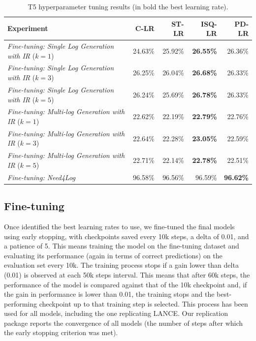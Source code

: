 \begin{table}[h!]
	\centering
	\caption{T5 hyperparameter tuning results (in bold the best learning rate).}
	\begin{tabular}{lrrrr}
		\toprule
		\textbf{Experiment}                  																		& \textbf{C-LR}              & \textbf{ST-LR}      & \textbf{ISQ-LR}        & \textbf{PD-LR} \\
		\midrule
		\textit{Fine-tuning: Single Log Generation with IR} ($k=1$)                         &   24.63\%                & 25.92\%    		           & \textbf{26.55\%}           &  26.36\%         \\
		\textit{Fine-tuning: Single Log Generation with IR} ($k=3$)                        &   26.25\%                & 26.04\%    		           & \textbf{26.68\%}          &  26.33\%         \\
		\textit{Fine-tuning: Single Log Generation with IR} ($k=5$)                         &  26.24\%                & 25.69\%    		           & \textbf{26.78\%}           &  26.33\%         \\
		\midrule
		\textit{Fine-tuning: Multi-log Generation with IR} ($k=1$)                         &   22.62\%                & 22.19\%    		           & \textbf{22.79\%}           &  22.76\%         \\
		\textit{Fine-tuning: Multi-log Generation with IR} ($k=3$)                        &   22.64\%                & 22.28\%    		           & \textbf{23.05\%}          &  22.59\%         \\
		\textit{Fine-tuning: Multi-log Generation with IR} ($k=5$)                         &   22.71\%                & 22.14\%    		           & \textbf{22.78\%}           &  22.51\%         \\
		\midrule
		\textit{Fine-tuning: Need4Log} & 96.58\%       & 96.56\%        & 96.59\%          & \textbf{96.62\%}\\
		\bottomrule
	\end{tabular}
	
	\label{tab:hp-results}
\end{table}



\subsection{Fine-tuning}
Once identified the best learning rates to use, we fine-tuned the final models using early stopping, with checkpoints saved every 10k steps, a delta of 0.01, and a patience of 5. This means training the model on the fine-tuning dataset and evaluating its performance (again in terms of correct predictions) on the evaluation set every 10k. The training process stops if a gain lower than delta (0.01) is observed at each  50k steps interval. This means that after 60k steps, the performance of the model is compared against that of the 10k checkpoint and, if the gain in performance is lower than 0.01, the training stops and the best-performing checkpoint up to that training step is selected. This process has been used for all models, including the one replicating LANCE. Our replication package \cite{replication} reports the convergence of all models (\ie the number of steps after which the early stopping criterion was met). 


